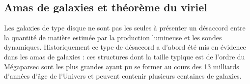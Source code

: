 \subsection{Amas de galaxies  et théorème du viriel}

Les galaxies de type disque ne sont pas les seules à présenter un désaccord entre la quantité de matière estimée par la production lumineuse et les sondes dynamiques. Historiquement ce type de désaccord a d'abord été mis en évidence dans les amas de galaxies : ces structures dont la taille typique est de l'ordre du Mégaparsec sont les plus grandes ayant pu se former au cours des 13 milliards d'années d'âge de l'Univers et peuvent contenir plusieurs centaines de galaxies.

